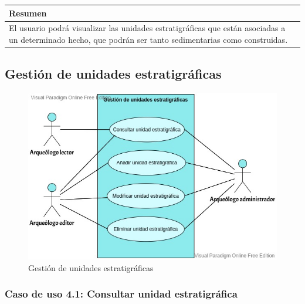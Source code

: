     \begin{table}[H]
        \centering
        \begin{tabularx}{\textwidth}{@{} |L |@{}} \hline
            \textbf{Resumen} \\
            \hline
            El usuario podrá visualizar las unidades estratigráficas que están asociadas
            a un determinado hecho, que podrán ser tanto sedimentarias como construidas. \\
            \hline
        \end{tabularx}
    \end{table}


\subsection{Gestión de unidades estratigráficas}
    \begin{figure}[H]
        \centering
        \includegraphics[scale=0.50]{imagenes/diagramas CU/UE-UC.jpeg}
        \caption{Gestión de unidades estratigráficas}
        \label{fig:ue-management}
    \end{figure}

\subsubsection{Caso de uso 4.1: Consultar unidad estratigráfica}

